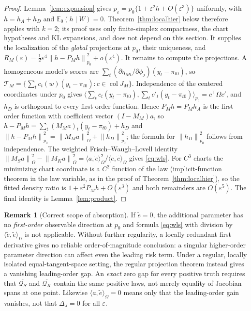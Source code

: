 \documentclass[11pt,letterpaper]{article}
\theoremstyle{plain}
\theoremstyle{definition}
\newtheorem{remark}[theorem]{Remark}
\newcommand{\E}{\mathbb E}
\newcommand{\norm}[1]{\left\|#1\right\|}
\begin{document}
\begin{proof}
Lemma~\ref{lem:expansion} gives $p_\varepsilon=p_0\{1+\varepsilon^2h+O(\varepsilon^3)\}$ uniformly, with $h=h_A+h_D$ and $\E_0(h\mid W)=0$. Theorem~\ref{thm:localhier} below therefore applies with $k=2$; its proof uses only finite-simplex compactness, the chart hypotheses and KL expansions, and does not depend on this section. It supplies the localization of the \emph{global} projections at $p_0$, their uniqueness, and $R_M(\varepsilon)=\frac12\varepsilon^4\norm{h-P_Mh}^2_{p_0}+o(\varepsilon^4)$. It remains to compute the projections. A homogeneous model's scores are $\sum_t(\partial\eta_{Mt}/\partial\phi_j)(y_t-\pi_{t0})$, so $\mathcal T_M=\{\sum_tc_t(w)(y_t-\pi_{t0}):c\in\operatorname{col}J_M\}$. Independence of the centered coordinates under $p_0$ gives $\langle\sum_tc_t(y_t-\pi_{t0}),\sum_tc'_t(y_t-\pi_{t0})\rangle_{p_0}=c^\top\Omega c'$, and $h_D$ is orthogonal to every first-order function. Hence $P_Mh=P_Mh_A$ is the first-order function with coefficient vector $(I-M_M)a$, so $h-P_Mh=\sum_t(M_Ma)_t(y_t-\pi_{t0})+h_D$ and $\norm{h-P_Mh}^2_{p_0}=\norm{M_Ma}^2_\Omega+\norm{h_D}^2_{p_0}$; the formula for $\norm{h_D}^2_{p_0}$ follows from independence. The weighted Frisch--Waugh--Lovell identity $\norm{M_Sa}^2_\Omega-\norm{M_Ka}^2_\Omega=\langle a,\tilde e\rangle_\Omega^2/\langle\tilde e,\tilde e\rangle_\Omega$ gives \eqref{eq:wls}. For $C^3$ charts the minimizing chart coordinate is a $C^2$ function of the law (implicit-function theorem in the law variable, as in the proof of Theorem~\ref{thm:localhier}), so the fitted density ratio is $1+\varepsilon^2P_Mh+O(\varepsilon^3)$ and both remainders are $O(\varepsilon^5)$. The final identity is Lemma~\ref{lem:product}.
\end{proof}
\begin{remark}[Correct scope of absorption]\label{rem:absorption}
If $\tilde e=0$, the additional parameter has no \emph{first-order} observable direction at $p_0$ and formula \eqref{eq:wls} with division by $\langle\tilde e,\tilde e\rangle_\Omega$ is not applicable. Without further regularity, a locally redundant first derivative gives no reliable order-of-magnitude conclusion: a singular higher-order parameter direction can affect even the leading risk term. Under a regular, locally isolated equal-tangent-space setting, the regular projection theorem instead gives a vanishing leading-order gap. An \emph{exact} zero gap for every positive truth requires that $\overline{\mathcal Q_S}$ and $\overline{\mathcal Q_K}$ contain the same positive laws, not merely equality of Jacobian spans at one point. Likewise $\langle a,\tilde e\rangle_\Omega=0$ means only that the leading-order gain vanishes, not that $\Delta_J=0$ for all $\varepsilon$.
\end{remark}
\end{document}
